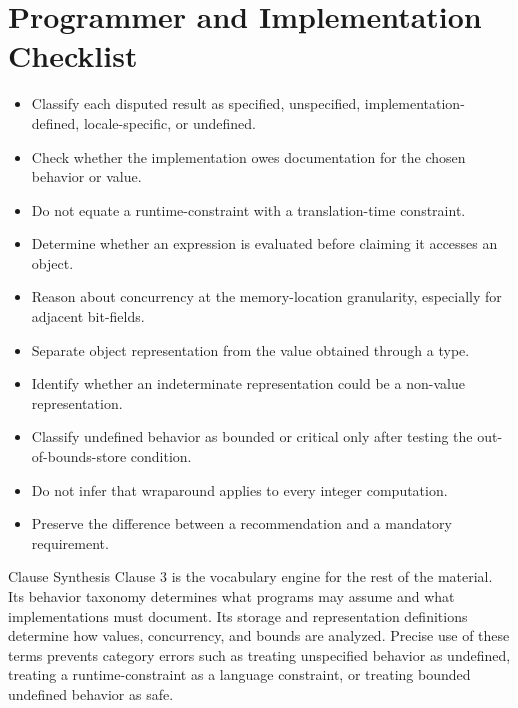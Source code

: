 \documentclass[10pt,letterpaper]{article}
\begin{document}
\section{Programmer and Implementation Checklist}
\begin{itemize}
  \item[$\square$] Classify each disputed result as specified, unspecified, implementation-defined, locale-specific, or undefined.
  \item[$\square$] Check whether the implementation owes documentation for the chosen behavior or value.
  \item[$\square$] Do not equate a runtime-constraint with a translation-time constraint.
  \item[$\square$] Determine whether an expression is evaluated before claiming it accesses an object.
  \item[$\square$] Reason about concurrency at the memory-location granularity, especially for adjacent bit-fields.
  \item[$\square$] Separate object representation from the value obtained through a type.
  \item[$\square$] Identify whether an indeterminate representation could be a non-value representation.
  \item[$\square$] Classify undefined behavior as bounded or critical only after testing the out-of-bounds-store condition.
  \item[$\square$] Do not infer that wraparound applies to every integer computation.
  \item[$\square$] Preserve the difference between a recommendation and a mandatory requirement.
\end{itemize}

\begin{CornellSummaryBox}{Clause Synthesis}
Clause 3 is the vocabulary engine for the rest of the material. Its behavior taxonomy determines what programs may assume and what implementations must document. Its storage and representation definitions determine how values, concurrency, and bounds are analyzed. Precise use of these terms prevents category errors such as treating unspecified behavior as undefined, treating a runtime-constraint as a language constraint, or treating bounded undefined behavior as safe.
\end{CornellSummaryBox}



\clearpage
\end{document}
